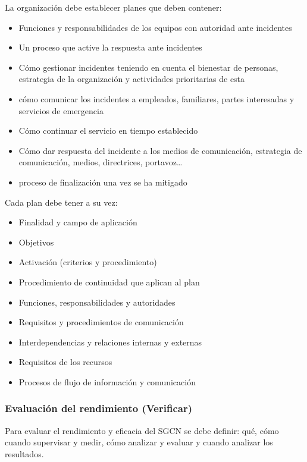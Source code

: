             La organización debe establecer planes que deben contener:
            \begin{itemize}
                \item Funciones y responsabilidades de los equipos con autoridad ante incidentes
                \item Un proceso que active la respuesta ante incidentes
                \item Cómo gestionar incidentes teniendo en cuenta el bienestar de personas, estrategia de la organización y actividades prioritarias de esta
                \item cómo comunicar los incidentes a empleados, familiares, partes interesadas y servicios de emergencia
                \item Cómo continuar el servicio en tiempo establecido
                \item Cómo dar respuesta del incidente a los medios de comunicación, estrategia de comunicación, medios, directrices, portavoz\dots
                \item proceso de finalización una vez se ha mitigado
            \end{itemize}

            Cada plan debe tener a su vez:
            \begin{itemize}
                \item Finalidad y campo de aplicación
                \item Objetivos
                \item Activación (criterios y procedimiento)
                \item Procedimiento de continuidad que aplican al plan
                \item Funciones, responsabilidades y autoridades
                \item Requisitos y procedimientos de comunicación
                \item Interdependencias y relaciones internas y externas
                \item Requisitos de los recursos
                \item Procesos de flujo de información y comunicación
            \end{itemize}

    \subsubsection{Evaluación del rendimiento (Verificar)} %
        Para evaluar el rendimiento y eficacia del SGCN se debe definir: qué, cómo cuando supervisar y medir, cómo analizar y evaluar y cuando analizar los resultados.

